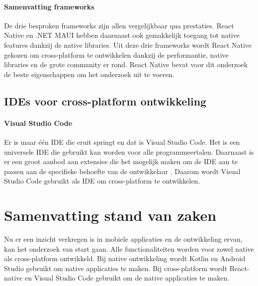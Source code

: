 \paragraph{Samenvatting frameworks}
De drie besproken frameworks zijn allen vergelijkbaar qua prestaties. React Native en 
.NET MAUI hebben daarnaast ook gemakkelijk toegang tot native features dankzij de native libraries. 
Uit deze drie frameworks wordt React Native gekozen om cross-platform te ontwikkelen 
dankzij de performantie, native libraries en de grote community er rond. React Native 
bevat voor dit onderzoek de beste eigenschappen om het onderzoek uit te voeren.

\subsection{IDEs voor cross-platform ontwikkeling}
\paragraph{Visual Studio Code}
Er is maar één IDE die eruit springt en dat is Visual Studio Code. Het is een 
universele IDE die gebruikt kan worden voor alle programmeertalen. Daarnaast is er een 
groot aanbod aan extensies die het mogelijk maken om de IDE aan te passen aan de 
specifieke behoefte van de ontwikkelaar \autocite{Heller2022}. Daarom wordt Visual 
Studio Code gebruikt als IDE om cross-platform te ontwikkelen.

\section{Samenvatting stand van zaken}
Nu er een inzicht verkregen is in mobiele applicaties en de ontwikkeling ervan, 
kan het onderzoek van start gaan. Alle functionaliteiten worden voor 
zowel native als cross-platform ontwikkeld. Bij native ontwikkeling wordt 
Kotlin en Android Studio gebruikt om native applicaties te maken. 
Bij cross-platform wordt React-native en Visual Studio Code gebruikt om de 
native applicaties te maken.














